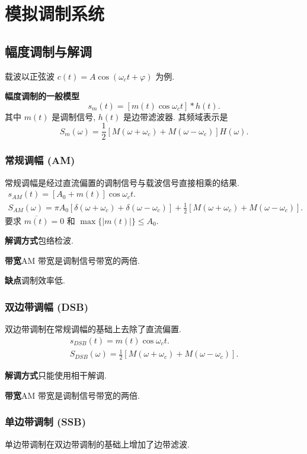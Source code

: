 \section{模拟调制系统}
\subsection{幅度调制与解调}
载波以正弦波 $c(t)=A\cos(\omega_ct+\varphi)$ 为例.

\textbf{幅度调制的一般模型}
\begin{equation}
    s_m(t)=[m(t)\cos\omega_ct]*h(t).
\end{equation}
其中 $m(t)$ 是调制信号, $h(t)$ 是边带滤波器. 其频域表示是
\begin{equation}
    S_m(\omega)=\frac{1}{2}[M(\omega+\omega_c)+M(\omega-\omega_c)]H(\omega).
\end{equation}

\subsubsection{常规调幅 (AM)}
常规调幅是经过直流偏置的调制信号与载波信号直接相乘的结果.
\begin{gather}
    s_{AM}(t)=[A_0+m(t)]\cos\omega_ct. \\
    S_{AM}(\omega)=\pi A_0[\delta(\omega+\omega_c)+\delta(\omega-\omega_c)]+\frac{1}{2}[M(\omega+\omega_c)+M(\omega-\omega_c)].
\end{gather}
要求 $\overline{m(t)}=0$ 和 $\max\{|m(t)|\}\leq A_0$.

\textbf{解调方式}\quad 包络检波.

\textbf{带宽}\quad AM 带宽是调制信号带宽的两倍.

\textbf{缺点}\quad 调制效率低.

\subsubsection{双边带调幅 (DSB)}
双边带调制在常规调幅的基础上去除了直流偏置.
\begin{gather}
    s_{DSB}(t)=m(t)\cos\omega_ct. \\
    S_{DSB}(\omega)=\frac{1}{2}[M(\omega+\omega_c)+M(\omega-\omega_c)].
\end{gather}

\textbf{解调方式}\quad 只能使用相干解调.

\textbf{带宽}\quad AM 带宽是调制信号带宽的两倍.

\subsubsection{单边带调制 (SSB)}
单边带调制在双边带调制的基础上增加了边带滤波.

